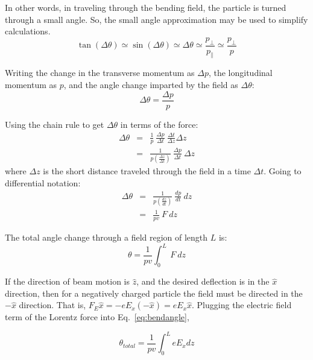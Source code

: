 \documentclass[12pt]{article}
\begin{document}
\begin{flushleft}
In other words, in traveling through the bending field, the particle is turned through a small angle.  So, the small angle approximation may be used to simplify calculations.
\[
\tan{(\Delta\theta)}\simeq \sin{(\Delta\theta)}\simeq \Delta\theta 
\simeq \frac{p_{\bot}}{p_{\parallel}} \simeq \frac{p_{\bot}}{p}
\]


Writing the change in the transverse momentum as $\Delta p$, the longitudinal momentum as $p$, and the angle change imparted by the field as $\Delta \theta$:
\[
\Delta \theta = \frac{\Delta p}{p}
\]

Using the chain rule to get $\Delta \theta$ in terms of the force:
\begin{eqnarray*}
\Delta \theta  & = & \frac{1}{p}\: \frac{\Delta p}{\Delta t} \:
                    \frac{\Delta t}{\Delta z}\Delta z\\
                      & = & \frac{1}{p\left(\frac{\Delta z}{\Delta t}\right)} \:
                    \frac{\Delta p}{\Delta t}\: \Delta z
\end{eqnarray*}
where $\Delta z$ is the short distance traveled through the field in a time 
$\Delta t$.  Going to differential notation:
\begin{eqnarray*}
\Delta \theta & = & \frac{1}{p\left(\frac{dz}{dt}\right)}\: 
                    \frac{dp}{dt}\: dz\\
              & = & \frac{1}{pv}\: F\: dz
\end{eqnarray*}

The total angle change through a field region of length $L$ is:
\begin{equation}
\theta = \frac{1}{pv} \int_{0}^{L}\: F\: dz
\label{eq:bendangle}
\end{equation}

If the direction of beam motion is $\hat{z}$, and the desired deflection is in the $\hat{x}$ direction, then for a negatively charged particle the field must be directed in the $-\hat{x}$ direction.  That is, $F_{E}\hat{x}=-eE_{x}(-\hat{x})=eE_{x}\hat{x}$.  Plugging the electric field term of the Lorentz force into Eq.~\ref{eq:bendangle},

\begin{equation}
\theta_{total}=\frac{1}{pv}\int_{0}^{L} eE_{x} dz
\label{eq:Eangle}
\end{equation}


\end{flushleft}
\end{document}
